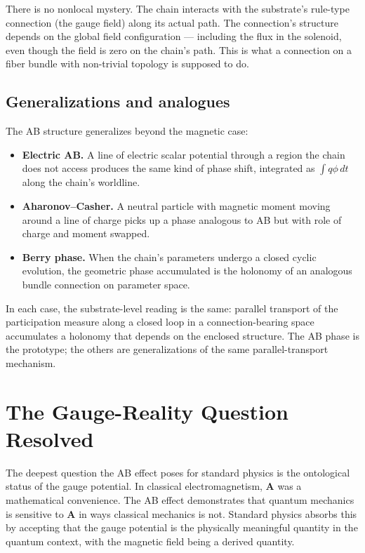 \documentclass[11pt,a4paper]{article}
\begin{document}
There is no nonlocal mystery. The chain interacts with the substrate's rule-type connection (the gauge field) along its actual path. The connection's structure depends on the global field configuration --- including the flux in the solenoid, even though the field is zero on the chain's path. This is what a connection on a fiber bundle with non-trivial topology is supposed to do.

\subsection{Generalizations and analogues}

The AB structure generalizes beyond the magnetic case:

\begin{itemize}[noitemsep]
  \item \textbf{Electric AB.} A line of electric scalar potential through a region the chain does not access produces the same kind of phase shift, integrated as $\int q \phi \, dt$ along the chain's worldline.
  \item \textbf{Aharonov--Casher.} A neutral particle with magnetic moment moving around a line of charge picks up a phase analogous to AB but with role of charge and moment swapped.
  \item \textbf{Berry phase.} When the chain's parameters undergo a closed cyclic evolution, the geometric phase accumulated is the holonomy of an analogous bundle connection on parameter space.
\end{itemize}

In each case, the substrate-level reading is the same: parallel transport of the participation measure along a closed loop in a connection-bearing space accumulates a holonomy that depends on the enclosed structure. The AB phase is the prototype; the others are generalizations of the same parallel-transport mechanism.

\section{The Gauge-Reality Question Resolved}

The deepest question the AB effect poses for standard physics is the ontological status of the gauge potential. In classical electromagnetism, $\mathbf{A}$ was a mathematical convenience. The AB effect demonstrates that quantum mechanics is sensitive to $\mathbf{A}$ in ways classical mechanics is not. Standard physics absorbs this by accepting that the gauge potential is the physically meaningful quantity in the quantum context, with the magnetic field being a derived quantity.
\end{document}
